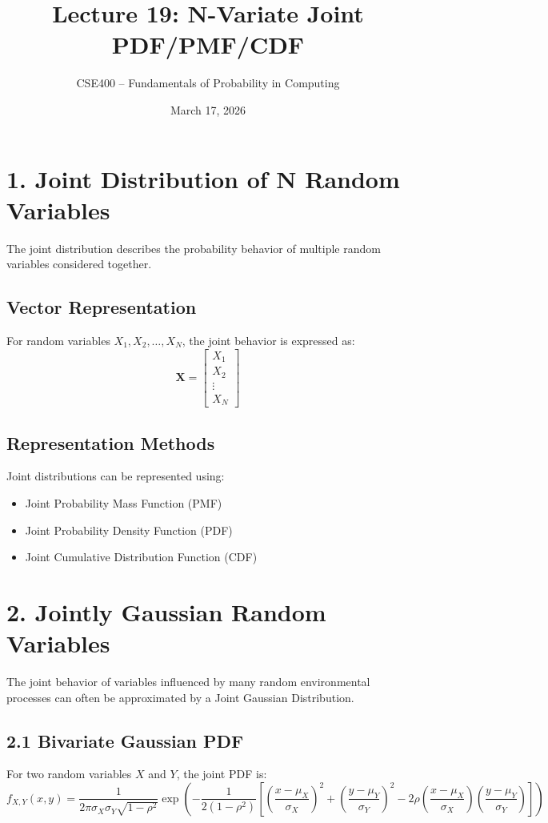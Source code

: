 \documentclass[12pt]{article}
\title{Lecture 19: N-Variate Joint PDF/PMF/CDF}
\author{CSE400 – Fundamentals of Probability in Computing}
\date{March 17, 2026}
\begin{document}
\maketitle

\section*{1. Joint Distribution of N Random Variables}

The joint distribution describes the probability behavior of multiple random variables considered together.

\subsection*{Vector Representation}
For random variables $X_1, X_2, \dots, X_N$, the joint behavior is expressed as:
\[
\mathbf{X} =
\begin{bmatrix}
X_1 \\
X_2 \\
\vdots \\
X_N
\end{bmatrix}
\]

\subsection*{Representation Methods}
Joint distributions can be represented using:
\begin{itemize}
    \item Joint Probability Mass Function (PMF)
    \item Joint Probability Density Function (PDF)
    \item Joint Cumulative Distribution Function (CDF)
\end{itemize}

\section*{2. Jointly Gaussian Random Variables}

The joint behavior of variables influenced by many random environmental processes can often be approximated by a Joint Gaussian Distribution.

\subsection*{2.1 Bivariate Gaussian PDF}

For two random variables $X$ and $Y$, the joint PDF is:
\[
f_{X,Y}(x,y) =
\frac{1}{2\pi\sigma_X\sigma_Y\sqrt{1-\rho^2}}
\exp\left(
-\frac{1}{2(1-\rho^2)}
\left[
\left(\frac{x-\mu_X}{\sigma_X}\right)^2 +
\left(\frac{y-\mu_Y}{\sigma_Y}\right)^2 -
2\rho\left(\frac{x-\mu_X}{\sigma_X}\right)
\left(\frac{y-\mu_Y}{\sigma_Y}\right)
\right]
\right)
\]
\end{document}

